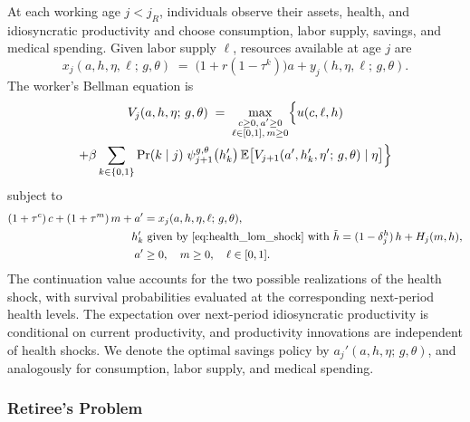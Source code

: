 \documentclass[12pt,a4paper]{article}
\newcommand{\E}{\mathbb{E}}
\begin{document}
At each working age $j < j_R$, individuals observe their assets, health, and idiosyncratic productivity and choose consumption, labor supply, savings, and medical spending. Given labor supply $\ell$, resources available at age $j$ are
\begin{equation}
\label{eq:resources_worker}
x_j(a, h, \eta, \ell;\, g, \theta) \;=\; \bigl(1 + r(1 - \tau^k)\bigr) a + y_j(h, \eta, \ell;\, g, \theta).
\end{equation}
The worker's Bellman equation is
\begin{multline}
\label{eq:worker_bellman}
V_j(a, h, \eta;\, g,\theta)
\;=\;
\max_{\substack{c \geq 0,\, a' \geq 0 \\ \ell \in [0,1],\, m \geq 0}}
\Bigl\{
u(c, \ell, h)
\\
+ \beta \sum_{k \in \{0,1\}} \Pr(k \mid j)\;
\psi_{j+1}^{g,\theta}\bigl(h'_k\bigr)\,
\E\bigl[V_{j+1}(a', h'_k, \eta';\, g, \theta) \mid \eta\bigr]
\Bigr\}
\end{multline}
subject to
\begin{align}
(1 + \tau^c)\, c + (1 + \tau^m)\, m + a' &= x_j(a, h, \eta, \ell;\, g, \theta), \label{eq:worker_budget}\\
h'_k &\ \text{given by~\eqref{eq:health_lom_shock} with } \tilde h = (1 - \delta_j^h)\, h + H_j(m, h), \label{eq:worker_health}\\
a' &\geq 0,\quad m \geq 0,\quad \ell \in [0,1]. \label{eq:worker_borrow}
\end{align}
The continuation value accounts for the two possible realizations of the health shock, with survival probabilities evaluated at the corresponding next-period health levels. The expectation over next-period idiosyncratic productivity is conditional on current productivity, and productivity innovations are independent of health shocks. We denote the optimal savings policy by $a_j'(a, h, \eta;\, g, \theta)$, and analogously for consumption, labor supply, and medical spending.


\subsubsection{Retiree's Problem}
\label{subsubsec:retiree}
\end{document}
